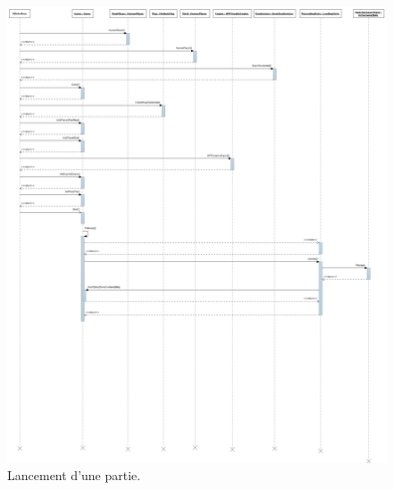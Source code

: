 \begin{figure}
    \begin{center}  
    \includegraphics[width=\textwidth]{lancement.png}
    \caption{Lancement d'une partie.}
    \label{lancement}
\end{center}
\end{figure}

